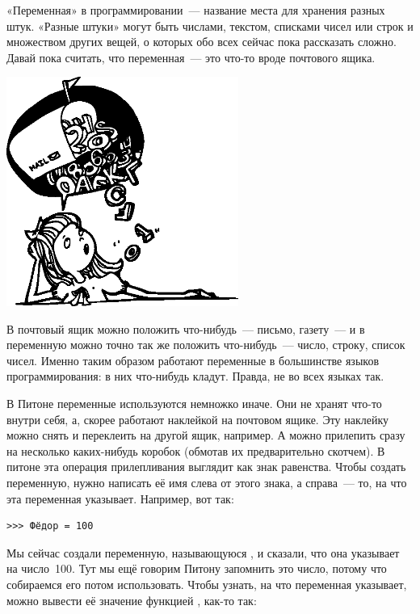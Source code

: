 «Переменная» в программировании — название места для хранения разных штук. «Разные штуки» могут быть числами, текстом, списками чисел или строк и множеством других вещей, о которых обо всех сейчас пока рассказать сложно. Давай пока считать, что переменная — это что-то вроде почтового ящика.

\begin{center}
\includegraphics*[width=76mm]{../en/girlbubble.eps}
\end{center}

В почтовый ящик можно положить что-нибудь — письмо, газету — и в переменную можно точно так же положить что-нибудь — число, строку, список чисел. Именно таким образом работают переменные в большинстве языков программирования: в них что-нибудь кладут. Правда, не во всех языках так.

В Питоне переменные используются немножко иначе. Они не хранят что-то внутри себя, а, скорее работают наклейкой на почтовом ящике. Эту наклейку можно снять и переклеить на другой ящик, например. А можно прилепить сразу на несколько каких-нибудь коробок (обмотав их предварительно скотчем). В питоне эта операция прилепливания выглядит как знак равенства. Чтобы создать переменную, нужно написать её имя слева от этого знака, а справа — то, на что эта переменная указывает. Например, вот так:

\begin{listing}
\begin{verbatim}
>>> Фёдор = 100
\end{verbatim}
\end{listing}

Мы сейчас создали переменную, называющуюся , и сказали, что она указывает на число 100. Тут мы ещё говорим Питону запомнить это число, потому что собираемся его потом использовать. Чтобы узнать, на что переменная указывает, можно вывести её значение функцией , как-то так:

